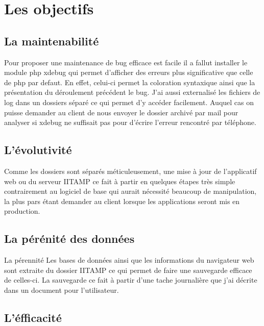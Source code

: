 \section{Les objectifs} %
\label{sec:Les objectifs}

\subsection{La maintenabilité} %
\label{sub:La maintenabilité}

Pour proposer une maintenance de bug efficace est facile il a fallut
installer le module php xdebug qui permet d'afficher des erreurs plus
significative que celle de php par defaut. En effet, celui-ci permet la
coloration syntaxique ainsi que la présentation du déroulement
précédent le bug. J'ai aussi externalisé les fichiers de log dans un
dossiers séparé ce qui permet d'y accéder facilement. Auquel cas on
puisse demander au client de nous envoyer le dossier archivé par mail
pour analyser si xdebug ne suffisait pas pour d'écrire l'erreur
rencontré par téléphone.

\subsection{L'évolutivité} %
\label{sub:L'évolutivité}
Comme les dossiers sont séparés méticuleusement, une
mise à jour de l'applicatif web ou du serveur IITAMP ce fait à partir en
quelques étapes très simple contrairement au logiciel de base qui aurait
nécessité beaucoup de manipulation, la plus pars étant demander au client
lorsque les applications seront mis en production.

\subsection{La pérénité des données} %
\label{sub:La pérénité des données}

La pérennité Les bases de données ainsi que les informations du
navigateur web sont extraite du dossier IITAMP ce qui permet de
faire une sauvegarde efficace de celles-ci. La sauvegarde ce fait à
partir d'une tache journalière que j'ai décrite dans un document pour
l'utilisateur.

\subsection{L'éfficacité} %
\label{sub:L'éfficacité}

